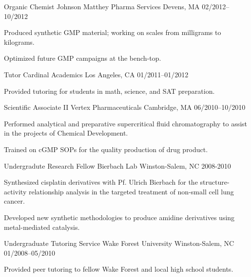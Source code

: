 \begin{cventries}
      \cventry
    {Organic Chemist} %
    {Johnson Matthey Pharma Services} %
    {Devens, MA} %
    {02/2012--10/2012} %
    {
      \begin{cvitems} %
        \item {Produced synthetic GMP material; working on scales from milligrams to kilograms.}
        \item {Optimized future GMP campaigns at the bench-top.}
      \end{cvitems}
    }

      \cventry
    {Tutor} %
    {Cardinal Academics} %
    {Los Angeles, CA} %
    {01/2011--01/2012} %
    {
      \begin{cvitems} %
        \item {Provided tutoring for students in math, science, and SAT preparation.}
      \end{cvitems}
    }
    
      \cventry
    {Scientific Associate II} %
    {Vertex Pharmaceuticals} %
    {Cambridge, MA} %
    {06/2010--10/2010} %
    {
      \begin{cvitems} %
        \item {Performed analytical and preparative supercritical fluid chromatography to assist in the projects of Chemical Development.}
        \item {Trained on cGMP SOPs for the quality production of drug product.}
      \end{cvitems}
    }
    
      \cventry
    {Undergradute Research Fellow} %
    {Bierbach Lab} %
    {Winston-Salem, NC} %
    {2008-2010} %
    {
      \begin{cvitems} %
        \item {Synthesized cisplatin derivatives with Pf. Ulrich Bierbach for the structure-activity relationship analysis in the targeted treatment of non-small cell lung cancer.}
        \item {Developed new synthetic methodologies to produce amidine derivatives using metal-mediated catalysis.}
      \end{cvitems}
    }      
    
      \cventry
    {Undergraduate Tutoring Service} %
    {Wake Forest University} %
    {Winston-Salem, NC} %
    {01/2008--05/2010} %
    {
      \begin{cvitems} %
        \item {Provided peer tutoring to fellow Wake Forest and local high school students.}
      \end{cvitems}
    }    
    



\end{cventries}
